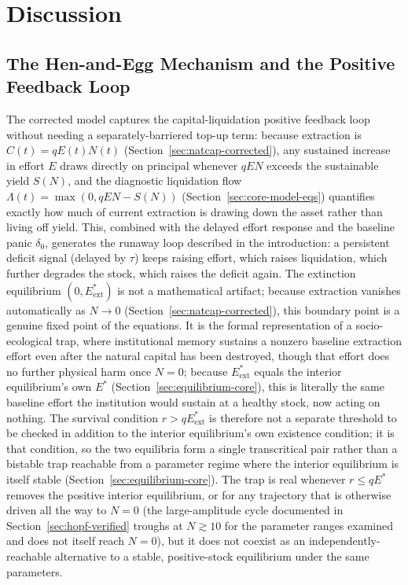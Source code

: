 \documentclass[twocolumn,10pt]{article}
\begin{document}
\section{Discussion}
\subsection{The Hen-and-Egg Mechanism and the Positive Feedback Loop}
\label{sec:discussion-liquidation}
The corrected model captures the capital-liquidation positive feedback loop without needing a separately-barriered top-up term: because extraction is $C(t)=qE(t)N(t)$ (Section~\ref{sec:natcap-corrected}), any sustained increase in effort $E$ draws directly on principal whenever $qEN$ exceeds the sustainable yield $S(N)$, and the diagnostic liquidation flow $\Lambda(t)=\max(0,qEN-S(N))$ (Section~\ref{sec:core-model-eqs}) quantifies exactly how much of current extraction is drawing down the asset rather than living off yield. This, combined with the delayed effort response and the baseline panic \(\delta_0\), generates the runaway loop described in the introduction: a persistent deficit signal (delayed by $\tau$) keeps raising effort, which raises liquidation, which further degrades the stock, which raises the deficit again. The extinction equilibrium \((0, E^*_{\text{ext}})\) is not a mathematical artifact; because extraction vanishes automatically as $N\to0$ (Section~\ref{sec:natcap-corrected}), this boundary point is a genuine fixed point of the equations. It is the formal representation of a socio-ecological trap, where institutional memory sustains a nonzero baseline extraction effort even after the natural capital has been destroyed, though that effort does no further physical harm once $N=0$; because $E^*_{\text{ext}}$ equals the interior equilibrium's own $E^*$ (Section~\ref{sec:equilibrium-core}), this is literally the same baseline effort the institution would sustain at a healthy stock, now acting on nothing. The survival condition \(r > qE^*_{\text{ext}}\) is therefore not a separate threshold to be checked in addition to the interior equilibrium's own existence condition; it is that condition, so the two equilibria form a single transcritical pair rather than a bistable trap reachable from a parameter regime where the interior equilibrium is itself stable (Section~\ref{sec:equilibrium-core}). The trap is real whenever $r\le qE^*$ removes the positive interior equilibrium, or for any trajectory that is otherwise driven all the way to $N=0$ (the large-amplitude cycle documented in Section~\ref{sec:hopf-verified} troughs at $N\gtrsim10$ for the parameter ranges examined and does not itself reach $N=0$), but it does not coexist as an independently-reachable alternative to a stable, positive-stock equilibrium under the same parameters.
\end{document}
